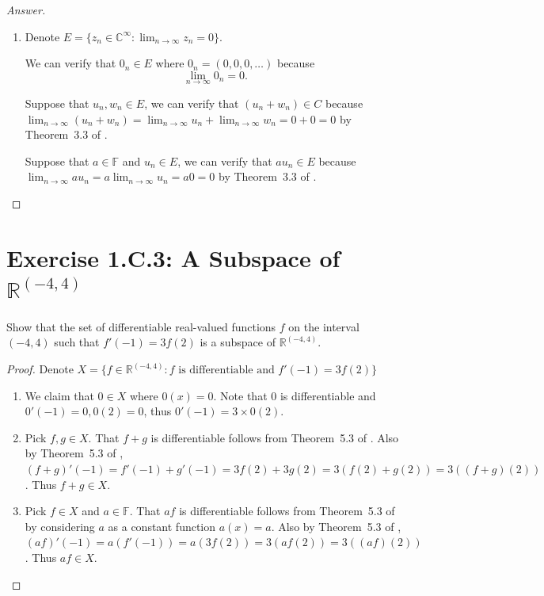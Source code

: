 \begin{proof}[Answer]
\begin{enumerate}[label=(\alph*)]
On the other hand, suppose that $D$ is a subspace. Then it implies that $0\in D$ where $0(x)=0$, and $0'(x)=0$ implies that $0'(2)=b=0$.
\item Denote $E=\{z_n\in\mathbb{C}^{\infty}:\lim_{n\to\infty} z_n=0\}$.

We can verify that $0_n\in E$ where $0_n=(0, 0, 0, \dots)$ because \[
\lim_{n\to\infty}0_n=0.
\]

Suppose that $u_n,w_n\in E$, we can verify that $(u_n+w_n)\in C$ because $\lim_{n\to\infty}(u_n+w_n)=\lim_{n\to\infty}u_n+\lim_{n\to\infty}w_n=0+0=0$ by Theorem~3.3 of \cite{rudin1976principles}.

Suppose that $a\in\mathbb{F}$ and $u_n\in E$, we can verify that $au_n\in E$ because $\lim_{n\to\infty}au_n=a\lim_{n\to\infty}u_n=a0=0$ by Theorem~3.3 of \cite{rudin1976principles}.
\end{enumerate}
\end{proof}

\section{Exercise 1.C.3: A Subspace of $\mathbb{R}^{(-4,4)}$}
Show that the set of differentiable real-valued functions $f$ on the interval $(-4,4)$ such that $f'(-1)=3f(2)$ is a subspace of $\mathbb{R}^{(-4,4)}$.
\begin{proof}
Denote $X=\{f\in\mathbb{R}^{(-4,4)}: f \text{ is differentiable and }f'(-1)=3f(2)\}$

\begin{enumerate}
\item We claim that $0\in X$ where $0(x)=0$. Note that $0$ is differentiable and $0'(-1)=0, 0(2)=0$, thus $0'(-1)=3\times0(2)$.
\item Pick $f,g\in X$. That $f+g$ is differentiable follows from Theorem~5.3 of \cite{rudin1976principles}. Also by Theorem~5.3 of \cite{rudin1976principles}, $(f+g)'(-1)=f'(-1)+g'(-1)=3f(2)+3g(2)=3(f(2)+g(2))=3((f+g)(2))$. Thus $f+g\in X$.
\item Pick $f\in X$ and $a\in \mathbb{F}$. That $af$ is differentiable follows from Theorem~5.3 of \cite{rudin1976principles} by considering $a$ as a constant function $a(x)=a$. Also by Theorem~5.3 of \cite{rudin1976principles}, $(af)'(-1)=a(f'(-1))=a(3f(2))=3(af(2))=3((af)(2))$. Thus $af\in X$.
\end{enumerate}
\end{proof}

